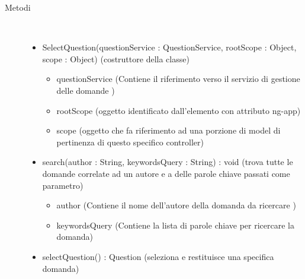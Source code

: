 \begin{description}
\item[Metodi] \hfill \\
 \vspace{-7mm}
\begin{itemize}
\item SelectQuestion(questionService : QuestionService, rootScope : Object, scope : Object) (costruttore della classe)\begin{itemize}
\item questionService (Contiene il riferimento verso il servizio di gestione delle domande )
\item rootScope (oggetto identificato dall’elemento con attributo ng-app)
\item scope (oggetto che fa riferimento ad una porzione di model di pertinenza di questo specifico controller)
\end{itemize}

\item search(author : String, keywordsQuery : String) : void (trova tutte le domande correlate ad un autore e a delle parole chiave passati come parametro)\begin{itemize}
\item author (Contiene il nome dell'autore della domanda da ricercare )
\item keywordsQuery (Contiene la lista di parole chiave per ricercare la domanda)
\end{itemize}

\item selectQuestion() : Question (seleziona e restituisce una specifica  domanda)
\end{itemize}

\end{description}

